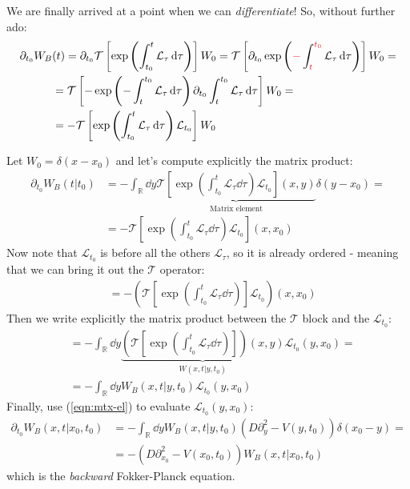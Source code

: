 \documentclass[../template.tex]{subfiles}
\begin{document}
\begin{exo}
\begin{enumerate}
        We are finally arrived at a point when we can \textit{differentiate}! So, without further ado:
        \begin{align*}
            \partial_{t_0} W_B &(t)= \partial_{t_0} \mathcal{T}\left[\exp\left(\int_{t_0}^t \mathcal{L}_\tau \dd{\tau}\right)\right] W_0 =  \mathcal{T}\left[\partial_{t_0}\exp\left(\textcolor{Red}{-}\int_{\textcolor{Red}{t}}^{\textcolor{Red}{t_0}} \mathcal{L}_\tau \dd{\tau}\right)\right] W_0 =\\
            &= \mathcal{T}\left[-\exp\left(-\int_{t}^{t_0} \mathcal{L}_\tau \dd{\tau}\right)\partial_{t_0} \int_{t}^{t_0} \mathcal{L}_\tau \dd{\tau} \right]W_0 =\\
            &= -\mathcal{T}\left[\exp\left(\int_{t_0}^t \mathcal{L}_{\tau} \dd{\tau}\right) \mathcal{L}_{t_0}\right] W_0 
        \end{align*}
        
        Let $W_0 = \delta(x-x_0)$ and let's compute explicitly the matrix product:
        \begin{align*}
            \partial_{t_0} W_B(t|t_0) &= -\int_{\mathbb{R}} \dd{y} \underbrace{\mathcal{T}\left[\exp\left(\int_{t_0}^t \mathcal{L}_{\tau} \dd{\tau}\right) \mathcal{L}_{t_0}\right](x,y) }_{\text{Matrix element}}\delta(y-x_0) =\\
            &= - \mathcal{T}\left[\exp\left(\int_{t_0}^t \mathcal{L}_{\tau} \dd{\tau}\right) \mathcal{L}_{t_0}\right](x,x_0)
        \end{align*}
        Now note that $\mathcal{L}_{t_0}$ is before all the others $\mathcal{L}_\tau$, so it is already ordered - meaning that we can bring it out the $\mathcal{T}$ operator:
        \begin{align*}
            &= -\left( \mathcal{T}\left[\exp\left(\int_{t_0}^t \mathcal{L}_\tau \dd{\tau}\right)\right] \mathcal{L}_{t_0} \right)(x,x_0)
        \end{align*}
        Then we write explicitly the matrix product between the $\mathcal{T}$ block and the $\mathcal{L}_{t_0}$:
        \begin{align*}
            &=-\int_{\mathbb{R}} \dd{y} \underbrace{ \left(\mathcal{T}\left[\exp\left(\int_{t_0}^t \mathcal{L}_\tau \dd{\tau}\right)\right] \right)(x,y)}_{W(x,t|y,t_0)} \mathcal{L}_{t_0}(y,x_0) =\\
            &= -\int_{\mathbb{R}}\dd{y} W_B(x,t|y,t_0) \mathcal{L}_{t_0} (y,x_0)
        \end{align*}
        Finally, use (\ref{eqn:mtx-el}) to evaluate $\mathcal{L}_{t_0}(y,x_0)$:
        \begin{align*}
           \partial_{t_0} W_B(x,t|x_0,t_0) &= -\int_{\mathbb{R}} \dd{y} W_B(x,t|y,t_0) (D \partial_y^2 - V(y,t_0)) \delta(x_0-y) =\\
           &= -(D\partial_{x_0}^2 - V(x_0,t_0))W_B(x,t|x_0,t_0)
        \end{align*}
        which is the \textit{backward} Fokker-Planck equation. 


\end{enumerate}
\end{exo}
\end{document}
